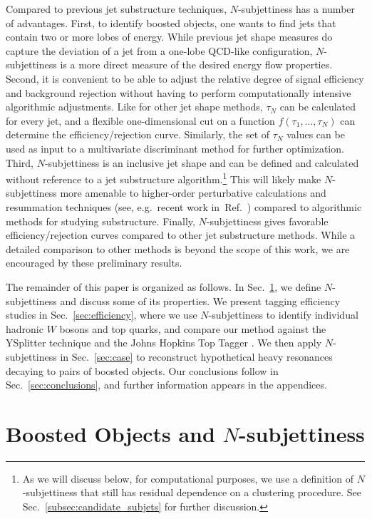 \documentclass{JHEP3}
\DeclareRobustCommand{\Sec}[1]{Sec.~\ref{#1}}
\DeclareRobustCommand{\Ref}[1]{Ref.~\cite{#1}}
\begin{document}
Compared to previous jet substructure techniques, $N$-subjettiness has a number of advantages.  First, to identify boosted objects, one wants to find jets that contain two or more lobes of energy.   While previous jet shape measures do capture the deviation of a jet from a one-lobe QCD-like configuration, $N$-subjettiness is a more direct measure of the desired energy flow properties.  Second, it is convenient to be able to adjust the relative degree of signal efficiency and background rejection without having to perform computationally intensive algorithmic adjustments.  Like for other jet shape methods, $\tau_N$ can be calculated for every jet, and a flexible one-dimensional cut on a function $f(\tau_1, \dots, \tau_N)$ can determine the efficiency/rejection curve.  Similarly, the set of $\tau_N$ values can be used as input to a multivariate discriminant method for further optimization.  Third, $N$-subjettiness is an inclusive jet shape and can be defined and calculated without reference to a jet substructure algorithm.\footnote{As we will discuss below, for computational purposes, we use a definition of $N$-subjettiness that still has residual dependence on a clustering procedure.  See \Sec{subsec:candidate_subjets} for further discussion.}  This will likely make $N$-subjettiness more amenable to higher-order perturbative calculations and resummation techniques  (see, e.g.~recent work in~\Ref{Ellis:2010rw,Banfi:2010pa}) compared to algorithmic methods for studying substructure.  Finally, $N$-subjettiness gives favorable efficiency/rejection curves compared to other jet substructure methods.  While a detailed comparison to other methods is beyond the scope of this work, we are encouraged by these preliminary results.

The remainder of this paper is organized as follows.  In \Sec{sec:nsubjettiness}, we define $N$-subjettiness and discuss some of its properties.  We present tagging efficiency studies in \Sec{sec:efficiency}, where we use $N$-subjettiness to identify individual hadronic $W$ bosons and top quarks, and compare our method against the YSplitter technique \cite{Butterworth:2002tt,YSplitter,Brooijmans:2008} and the Johns Hopkins Top Tagger \cite{Kaplan:2008ie}.  We then apply $N$-subjettiness in \Sec{sec:case} to reconstruct hypothetical heavy resonances decaying to pairs of boosted objects.  Our conclusions follow in \Sec{sec:conclusions}, and further information appears in the appendices.

\section{Boosted Objects and $N$-subjettiness} 
\label{sec:nsubjettiness}
\end{document}

